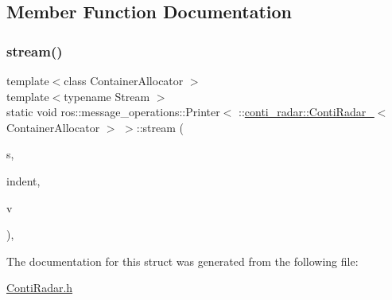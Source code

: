 \subsection{Member Function Documentation}
\mbox{\label{structros_1_1message__operations_1_1Printer_3_01_1_1conti__radar_1_1ContiRadar___3_01ContainerAllocator_01_4_01_4_a6a51c80723a074fd1087c53ce05d3b3a}} 
\subsubsection{\texorpdfstring{stream()}{stream()}}
{\footnotesize\ttfamily template$<$class Container\+Allocator $>$ \\
template$<$typename Stream $>$ \\
static void ros\+::message\+\_\+operations\+::\+Printer$<$ \+::\hyperlink{structconti__radar_1_1ContiRadar__}{conti\+\_\+radar\+::\+Conti\+Radar\+\_\+}$<$ Container\+Allocator $>$ $>$\+::stream (\begin{DoxyParamCaption}\item[{Stream \&}]{s,  }\item[{const std\+::string \&}]{indent,  }\item[{const \+::\hyperlink{structconti__radar_1_1ContiRadar__}{conti\+\_\+radar\+::\+Conti\+Radar\+\_\+}$<$ Container\+Allocator $>$ \&}]{v }\end{DoxyParamCaption})\hspace{0.3cm}{\ttfamily [inline]}, {\ttfamily [static]}}



The documentation for this struct was generated from the following file\+:\begin{DoxyCompactItemize}
\item 
\hyperlink{ContiRadar_8h}{Conti\+Radar.\+h}\end{DoxyCompactItemize}
